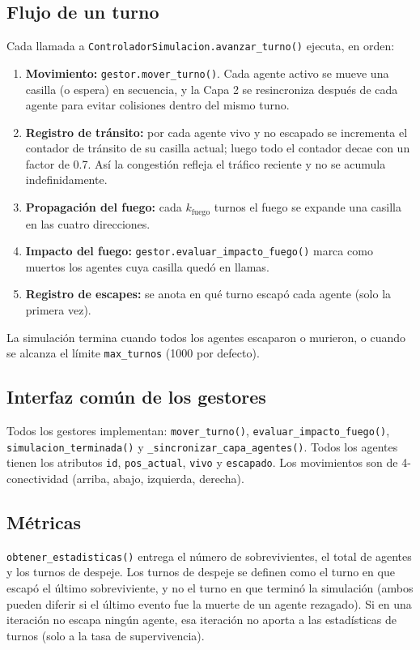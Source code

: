 \documentclass[11pt,a4paper]{article}
\begin{document}
\subsection{Flujo de un turno}
Cada llamada a \texttt{ControladorSimulacion.avanzar\_turno()} ejecuta, en orden:
\begin{enumerate}
    \item \textbf{Movimiento:} \texttt{gestor.mover\_turno()}. Cada agente activo se mueve una casilla (o espera) en secuencia, y la Capa 2 se resincroniza después de cada agente para evitar colisiones dentro del mismo turno.
    \item \textbf{Registro de tránsito:} por cada agente vivo y no escapado se incrementa el contador de tránsito de su casilla actual; luego todo el contador decae con un factor de 0.7. Así la congestión refleja el tráfico reciente y no se acumula indefinidamente.
    \item \textbf{Propagación del fuego:} cada $k_{\text{fuego}}$ turnos el fuego se expande una casilla en las cuatro direcciones.
    \item \textbf{Impacto del fuego:} \texttt{gestor.evaluar\_impacto\_fuego()} marca como muertos los agentes cuya casilla quedó en llamas.
    \item \textbf{Registro de escapes:} se anota en qué turno escapó cada agente (solo la primera vez).
\end{enumerate}

La simulación termina cuando todos los agentes escaparon o murieron, o cuando se alcanza el límite \texttt{max\_turnos} (1000 por defecto).

\subsection{Interfaz común de los gestores}
Todos los gestores implementan: \texttt{mover\_turno()}, \texttt{evaluar\_impacto\_fuego()}, \texttt{simulacion\_terminada()} y \texttt{\_sincronizar\_capa\_agentes()}. Todos los agentes tienen los atributos \texttt{id}, \texttt{pos\_actual}, \texttt{vivo} y \texttt{escapado}. Los movimientos son de 4-conectividad (arriba, abajo, izquierda, derecha).

\subsection{Métricas}
\texttt{obtener\_estadisticas()} entrega el número de sobrevivientes, el total de agentes y los turnos de despeje. Los turnos de despeje se definen como el turno en que escapó el último sobreviviente, y no el turno en que terminó la simulación (ambos pueden diferir si el último evento fue la muerte de un agente rezagado). Si en una iteración no escapa ningún agente, esa iteración no aporta a las estadísticas de turnos (solo a la tasa de supervivencia).
\end{document}
